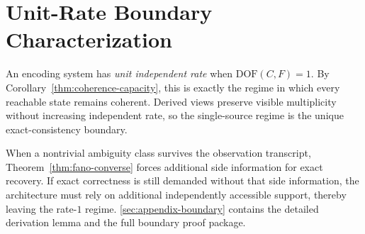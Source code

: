 \section{Unit-Rate Boundary Characterization}\label{sec:ssot}

An encoding system has \emph{unit independent rate} when $\mathrm{DOF}(C,F)=1$. By Corollary~\ref{thm:coherence-capacity}, this is exactly the regime in which every reachable state remains coherent. Derived views preserve visible multiplicity without increasing independent rate, so the single-source regime is the unique exact-consistency boundary.

When a nontrivial ambiguity class survives the observation transcript, Theorem~\ref{thm:fano-converse} forces additional side information for exact recovery. If exact correctness is still demanded without that side information, the architecture must rely on additional independently accessible support, thereby leaving the rate-$1$ regime. \ref{sec:appendix-boundary} contains the detailed derivation lemma and the full boundary proof package.

